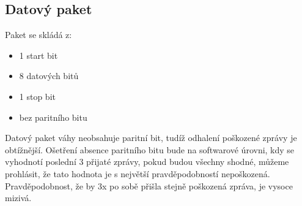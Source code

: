 \subsection{Datový paket}
\label{datový paket váhy}

Paket se skládá z:
\begin{itemize}
    \item 1 start bit
    \item 8 datových bitů
    \item 1 stop bit
    \item bez paritního bitu
\end{itemize}
%
Datový paket váhy neobsahuje paritní bit, tudíž odhalení poškozené zprávy je obtížnější. Ošetření absence paritního bitu bude na softwarové úrovni, kdy se vyhodnotí poslední 3 přijaté zprávy, pokud budou všechny shodné, můžeme prohlásit, že tato hodnota je s největší pravděpodobností nepoškozená. Pravděpodobnost, že by 3x po sobě přišla stejně poškozená zpráva, je vysoce mizivá.






